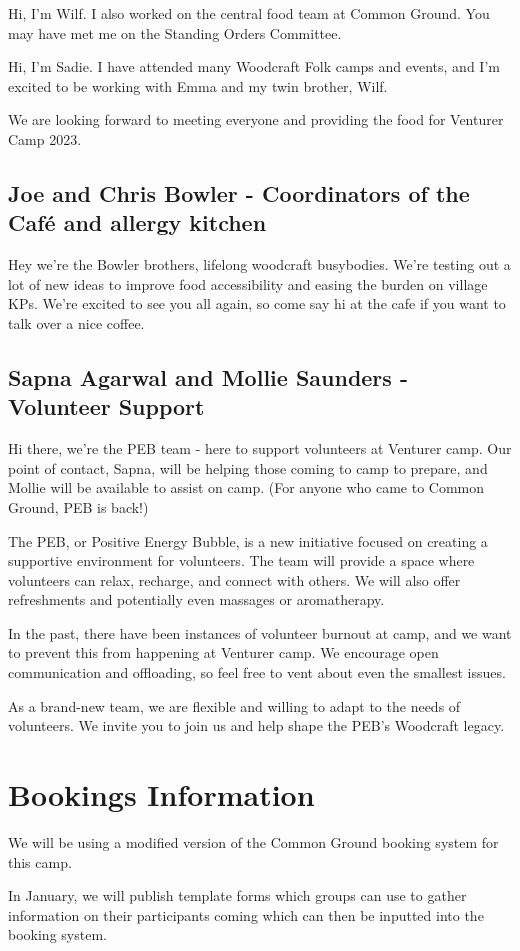 \documentclass[a4paper, 10pt]{report}
\begin{document}
Hi, I'm Wilf. I also worked on the central food team at Common Ground. You may have met me on the Standing Orders Committee.

Hi, I'm Sadie. I have attended many Woodcraft Folk camps and events, and I'm excited to be working with Emma and my twin brother, Wilf.

We are looking forward to meeting everyone and providing the food for Venturer Camp 2023.
\section{Joe and Chris Bowler - Coordinators of the Café and allergy kitchen }
Hey we're the Bowler brothers, lifelong woodcraft busybodies. We're testing out a lot of new ideas to improve food accessibility and easing the burden on village KPs. We're excited to see you all again, so come say hi at the cafe if you want to talk over a nice coffee.
\section{Sapna Agarwal and Mollie Saunders - Volunteer Support}
Hi there, we're the PEB team - here to support volunteers at Venturer camp. Our point of contact, Sapna, will be helping those coming to camp to prepare, and Mollie will be available to assist on camp. (For anyone who came to Common Ground, PEB is back!)

The PEB, or Positive Energy Bubble, is a new initiative focused on creating a supportive environment for volunteers. The team will provide a space where volunteers can relax, recharge, and connect with others. We will also offer refreshments and potentially even massages or aromatherapy.

In the past, there have been instances of volunteer burnout at camp, and we want to prevent this from happening at Venturer camp. We encourage open communication and offloading, so feel free to vent about even the smallest issues.

As a brand-new team, we are flexible and willing to adapt to the needs of volunteers. We invite you to join us and help shape the PEB's Woodcraft legacy.


\chapter{Bookings Information}
We will be using a modified version of the Common Ground booking system for this camp.

In January, we will publish template forms which groups can use to gather information on their participants coming which can then be inputted into the booking system.
\end{document}
